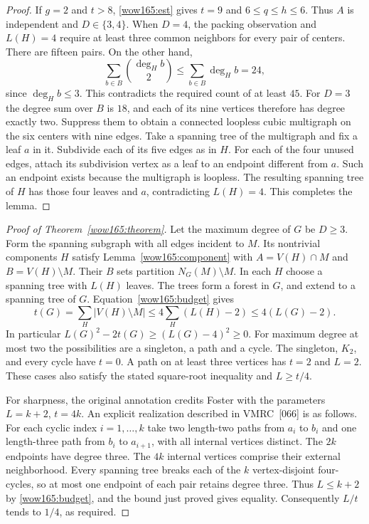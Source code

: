 \documentclass[11pt,a4paper]{article}
\numberwithin{equation}{section}
\begin{document}
\begin{proof}
If $g=2$ and $t>8$, \eqref{wow165:est} gives $t=9$ and
$6\le q\le h\le6$. Thus $A$ is independent and $D\in\{3,4\}$.
When $D=4$, the packing observation and $L(H)=4$ require at least
three common neighbors for every pair of centers. There are fifteen
pairs. On the other hand,
\[
 \sum_{b\in B}\binom{\deg_H b}{2}\le\sum_{b\in B}\deg_H b=24,
\]
since $\deg_H b\le3$. This contradicts the required count of at least
$45$. For $D=3$ the degree sum over $B$ is $18$, and each of its nine
vertices therefore has degree exactly two. Suppress them to obtain a
connected loopless cubic multigraph on the six centers with nine
edges. Take a spanning tree of the multigraph and fix a leaf $a$ in
it. Subdivide each of its five edges as in $H$. For each of the four
unused edges, attach its subdivision vertex as a leaf to an endpoint
different from $a$. Such an endpoint exists because the multigraph is
loopless. The resulting spanning tree of $H$ has those four leaves
and $a$, contradicting $L(H)=4$. This completes the lemma.
\end{proof}

\begin{proof}[Proof of Theorem~\ref{wow165:theorem}]
Let the maximum degree of $G$ be $D\ge3$. Form the spanning subgraph
with all edges incident to $M$. Its nontrivial components $H$ satisfy
Lemma~\ref{wow165:component} with $A=V(H)\cap M$ and $B=V(H)\setminus M$.
Their $B$ sets partition $N_G(M)\setminus M$. In each $H$ choose a
spanning tree with $L(H)$ leaves. The trees form a forest in $G$,
and extend to a spanning tree of $G$. Equation~\eqref{wow165:budget}
gives
\[
 t(G)=\sum_H |V(H)\setminus M|
 \le4\sum_H(L(H)-2)\le4(L(G)-2).
\]
In particular $L(G)^2-2t(G)\ge(L(G)-4)^2\ge0$. For maximum degree at
most two the possibilities are a singleton, a path and a cycle.
The singleton, $K_2$, and every cycle have $t=0$. A path on at least
three vertices has $t=2$ and $L=2$. These cases also satisfy the
stated square-root inequality and $L\ge t/4$.

For sharpness, the original annotation credits Foster with the
parameters $L=k+2$, $t=4k$. An explicit realization described in
VMRC~[066] is as follows. For each cyclic index $i=1,\ldots,k$ take
two length-two paths from $a_i$ to $b_i$ and one length-three path
from $b_i$ to $a_{i+1}$, with all internal vertices distinct. The
$2k$ endpoints have degree three. The $4k$ internal vertices comprise
their external neighborhood. Every spanning tree breaks each of the
$k$ vertex-disjoint four-cycles, so at most one endpoint of each pair
retains degree three. Thus $L\le k+2$ by \eqref{wow165:budget}, and
the bound just proved gives equality. Consequently $L/t$ tends to
$1/4$, as required.
\end{proof}
\end{document}
